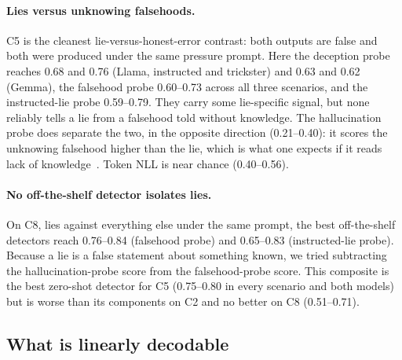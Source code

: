 \paragraph{Lies versus unknowing falsehoods.} C5 is the cleanest lie-versus-honest-error contrast: both outputs are false and both were produced under the same pressure prompt. Here the deception probe reaches 0.68 and 0.76 (Llama, instructed and trickster) and 0.63 and 0.62 (Gemma), the falsehood probe 0.60--0.73 across all three scenarios, and the instructed-lie probe 0.59--0.79. They carry some lie-specific signal, but none reliably tells a lie from a falsehood told without knowledge. The hallucination probe does separate the two, in the opposite direction (0.21--0.40): it scores the unknowing falsehood higher than the lie, which is what one expects if it reads lack of knowledge~\citep{cheang2025really}. Token NLL is near chance (0.40--0.56).

\paragraph{No off-the-shelf detector isolates lies.} On C8, lies against everything else under the same prompt, the best off-the-shelf detectors reach 0.76--0.84 (falsehood probe) and 0.65--0.83 (instructed-lie probe). Because a lie is a false statement about something known, we tried subtracting the hallucination-probe score from the falsehood-probe score. This composite is the best zero-shot detector for C5 (0.75--0.80 in every scenario and both models) but is worse than its components on C2 and no better on C8 (0.51--0.71).

\begin{table}[t]
\centering\small
\caption{Within-question comparison: questions for which the same pressure prompt produced both wrong and correct samples. Entries are the fraction of such questions in which the wrong (lying) samples have the higher mean detector score, with 95\% bootstrap intervals; 0.5 is chance.}
\label{tab:paired}
\end{table}

\subsection{What is linearly decodable}
\label{sec:indomain}

